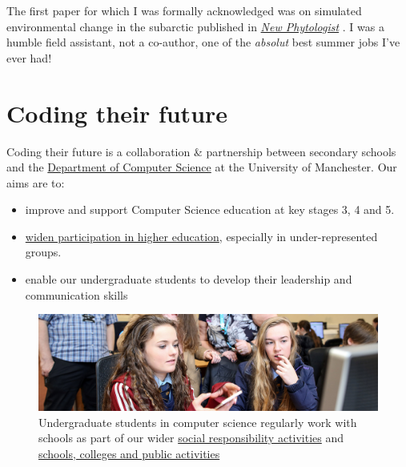 \documentclass[
  12pt,
]{book}
\providecommand{\tightlist}{%
  \setlength{\itemsep}{0pt}\setlength{\parskip}{0pt}}
\begin{document}
The first paper for which I was formally acknowledged was on simulated environmental change in the subarctic published in \href{https://en.wikipedia.org/wiki/New_Phytologist}{\emph{New Phytologist}} \citep{subarctic}. I was a humble field assistant, not a co-author, one of the \emph{absolut} best summer jobs I've ever had!

\hypertarget{coding-their-future}{%
\chapter{Coding their future}\label{coding-their-future}}

Coding their future is a collaboration \& partnership between secondary schools and the \href{https://www.cs.manchester.ac.uk/}{Department of Computer Science} at the University of Manchester. Our aims are to:

\begin{itemize}
\tightlist
\item
  improve and support Computer Science education at key stages 3, 4 and 5. \citep{shutdownrestart, afterthereboot, cse, cambridgegcse}
\item
  \href{https://www.manchester.ac.uk/discover/social-responsibility/widening-participation/}{widen participation in higher education}, especially in under-represented groups. \citep{wideningparticipation, classceiling, nicebutdim, breakintoelite}
\item
  enable our undergraduate students to develop their leadership and communication skills
\end{itemize}



\begin{figure}

{\centering \includegraphics[width=0.98\linewidth]{images/schools-banner} 

}

\caption{Undergraduate students in computer science regularly work with schools as part of our wider \href{https://www.cs.manchester.ac.uk/connect/social-responsibility/}{social responsibility activities} \citep{m2020, m20202} and \href{https://www.cs.manchester.ac.uk/connect/schools-colleges-public/}{schools, colleges and public activities}}\label{fig:unnamed-chunk-6}
\end{figure}
\end{document}

